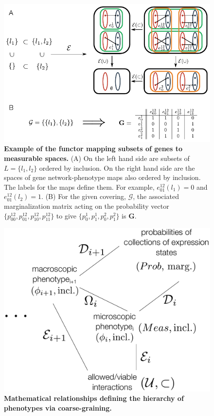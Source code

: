 
\FloatBarrier
\pagebreak

\begin{figure}[!ht]
\centering
\noindent\includegraphics[width=0.8\columnwidth]{fig/efunctor.pdf}
\caption{{\bf Example of the functor mapping subsets of genes to measurable spaces.} (A) On the left hand side are subsets of $L=\{l_1,l_2\}$ ordered by inclusion. On the right hand side are the spaces of gene network-phenotype maps also ordered by inclusion. The labels for the maps define them. For example, $e^{12}_{01}(l_1) = 0$ and $e^{12}_{01}(l_2) = 1$. (B) For the given covering, $\mathcal{G}$, the associated marginalization matrix acting on the probability vector $\{ p^{12}_{00},p^{12}_{01},p^{12}_{10},p^{12}_{11} \}$ to give $\{ p^{1}_{0},p^{1}_{1},p^{2}_{0},p^{2}_{1} \}$ is $\mathbf{G}$.}
\label{fig:efunctor}
\end{figure}

\pagebreak

\begin{figure}[!ht]
\centering
\noindent\includegraphics[width=0.4\columnwidth]{fig/abstractroadmap.pdf}
\caption{{\bf Mathematical relationships defining the hierarchy of phenotypes via coarse-graining.} }
\label{fig:abstractroadmap}
\end{figure}


